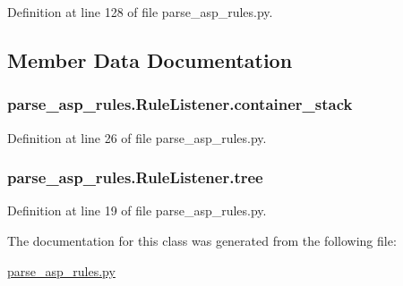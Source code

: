 Definition at line 128 of file parse\+\_\+asp\+\_\+rules.\+py.



\subsection{Member Data Documentation}
\hypertarget{classparse__asp__rules_1_1_rule_listener_a018b6fd2188baceee8498a529d0df9f8}{}
\subsubsection[{container\+\_\+stack}]{\setlength{\rightskip}{0pt plus 5cm}parse\+\_\+asp\+\_\+rules.\+Rule\+Listener.\+container\+\_\+stack}\label{classparse__asp__rules_1_1_rule_listener_a018b6fd2188baceee8498a529d0df9f8}


Definition at line 26 of file parse\+\_\+asp\+\_\+rules.\+py.

\hypertarget{classparse__asp__rules_1_1_rule_listener_a6923e5b023bb9c94836a12a3bb80f184}{}
\subsubsection[{tree}]{\setlength{\rightskip}{0pt plus 5cm}parse\+\_\+asp\+\_\+rules.\+Rule\+Listener.\+tree}\label{classparse__asp__rules_1_1_rule_listener_a6923e5b023bb9c94836a12a3bb80f184}


Definition at line 19 of file parse\+\_\+asp\+\_\+rules.\+py.



The documentation for this class was generated from the following file\+:\begin{DoxyCompactItemize}
\item 
\hyperlink{parse__asp__rules_8py}{parse\+\_\+asp\+\_\+rules.\+py}\end{DoxyCompactItemize}
